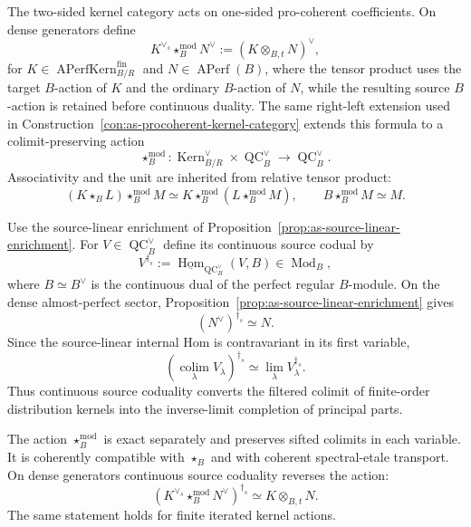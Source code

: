 \begin{construction}
\label{con:as-kernel-module-action}
The two-sided kernel category acts on one-sided pro-coherent coefficients.
On dense generators define
\[
\boxed{
    K^{\vee_s}\star_B^{\mathrm{mod}}N^\vee
    :=
    \left(
        K\otimes_{B,t}N
    \right)^\vee,
}
\]
for
$K\in\operatorname{APerfKern}^{\mathrm{fin}}_{B/R}$ and
$N\in\operatorname{APerf}(B)$, where the tensor product uses the target
$B$-action of $K$ and the ordinary $B$-action of $N$, while the resulting
source $B$-action is retained before continuous duality.  The same
right-left extension used in
Construction~\ref{con:as-procoherent-kernel-category} extends this formula
to a colimit-preserving action
\[
\boxed{
    \star_B^{\mathrm{mod}}:
    \operatorname{Kern}^{\vee}_{B/R}
    \times
    \operatorname{QC}^{\vee}_B
    \longrightarrow
    \operatorname{QC}^{\vee}_B.
}
\]
Associativity and the unit are inherited from relative tensor product:
\[
    (K\star_BL)\star_B^{\mathrm{mod}}M
    \simeq
    K\star_B^{\mathrm{mod}}
    \left(L\star_B^{\mathrm{mod}}M\right),
    \qquad
    B\star_B^{\mathrm{mod}}M\simeq M.
\]

Use the source-linear enrichment of
Proposition~\ref{prop:as-source-linear-enrichment}.  For
$V\in\operatorname{QC}^{\vee}_B$ define its continuous source codual by
\[
\boxed{
    V^{\dagger_s}
    :=
    \underline{\operatorname{Hom}}_{\operatorname{QC}^{\vee}_B}
    (V,B)
    \in
    \operatorname{Mod}_B,
}
\]
where $B\simeq B^\vee$ is the continuous dual of the perfect regular
$B$-module.  On the dense almost-perfect sector,
Proposition~\ref{prop:as-source-linear-enrichment} gives
\[
\boxed{
    (N^\vee)^{\dagger_s}\simeq N.
}
\]
Since the source-linear internal Hom is contravariant in its first variable,
\[
\boxed{
    \left(\operatorname*{colim}_\lambda V_\lambda\right)^{\dagger_s}
    \simeq
    \lim_\lambda V_\lambda^{\dagger_s}.
}
\]
Thus continuous source coduality converts the filtered colimit of finite-order
distribution kernels into the inverse-limit completion of principal parts.
\end{construction}

\begin{proposition}
\label{prop:as-kernel-module-action}
The action $\star_B^{\mathrm{mod}}$ is exact separately and preserves sifted
colimits in each variable.  It is coherently compatible with
$\star_B$ and with coherent spectral-etale transport.  On dense generators
continuous source coduality reverses the action:
\[
\boxed{
    \left(
        K^{\vee_s}\star_B^{\mathrm{mod}}N^\vee
    \right)^{\dagger_s}
    \simeq
    K\otimes_{B,t}N.
}
\]
The same statement holds for finite iterated kernel actions.
\end{proposition}

